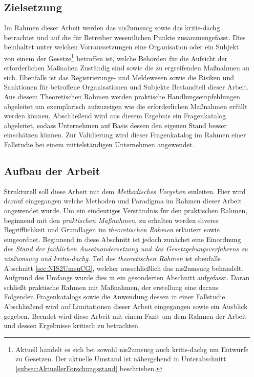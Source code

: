 \documentclass[11pt,a4paper,hidelinks]{article}   %
\begin{document}
    \subsection{Zielsetzung}
        Im Rahmen dieser Arbeit werden das \gls{nis2umsucg} sowie das \gls{kritis-dachg} betrachtet und auf die für Betreiber wesentlichen Punkte zusammengefasst. Dies beinhaltet unter welchen Vorraussetzungen eine Organisation oder ein Subjekt von einem der Gesetze\footnote{Aktuell handelt es sich bei sowohl \gls{nis2umsucg} auch \gls{kritis-dachg} um Entwürfe zu Gesetzen. Der aktuelle Umstand ist nähergehend in Unterabschnitt \ref{subsec:AktuellerForschungsstand} beschrieben.} betroffen ist, welche Behörden für die Aufsicht der erforderlichen Maßnahen Zuständig sind sowie die zu ergreifenden Maßnahmen an sich. Ebenfalls ist das Registrierungs- und Meldewesen sowie die Risiken und Sanktionen für betroffene Organisationen und Subjekte Bestandteil dieser Arbeit. Aus diesem Theoretischen Rahmen werden praktische Handlungsempfehlungen abgeleitet um exemplarisch aufzuzeigen wie die erforderlichen Maßnahmen erfüllt werden können. Abschließend wird aus diesem Ergebnis ein Fragenkatalog abgeleitet, sodass Unternehmen auf Basis dessen den eigenen Stand besser einschätzen können. Zur Validierung wird dieser Fragenkatalog im Rahmen einer Fallstudie bei einem mittelständigen Unternehmen angewendet.
    \subsection{Aufbau der Arbeit}
        Strukturell soll diese Arbeit mit dem \emph{Methodisches Vorgehen} einleiten. Hier wird darauf eingegangen welche Methoden und Paradigma im Rahmen dieser Arbeit angewendet wurde. Um ein eindeutiges Verständnis für den praktischen Rahmen, beginnend mit den \emph{praktischen Maßnahmen}, zu erhalten werden diverse Begrifflichkeit und Grundlagen im \emph{theoretischen Rahmen} erläutert sowie eingeordnet. Beginnend in diese Abschnitt ist jedoch zunächst eine Einordnung des \emph{Stand der fachlichen Auseinandersetzung und des Gesetzgebungsverfahrens zu \gls{nis2umsucg} und \gls{kritis-dachg}}. Teil des \emph{theoretischen Rahmen} ist ebenfalls Abschnitt \ref{sec:NIS2UmsuCG}, welcher ausschließlich das \gls{nis2umsucg} behandelt. Aufgrund des Umfangs wurde dies in ein gesonderten Abschnitt aufgefasst. Daran schließt praktische Rahmen mit Maßnahmen, der erstellung eine daraus Folgenden Fragenkatalogs sowie die Anwendung dessen in einer Fallstudie. Abschließend wird auf Limitationen dieser Arbeit eingegangen sowie ein Ausblick gegeben. Beendet wird diese Arbeit mit einem Fazit um dem Rahmen der Arbeit und dessen Ergebnisse kritisch zu betrachten.
    \newpage
\end{document}
